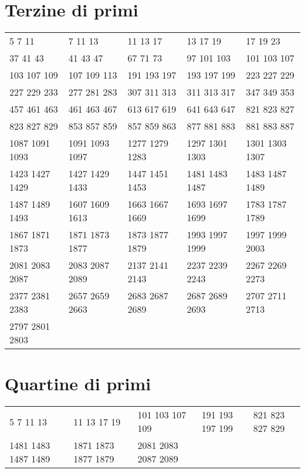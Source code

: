 \section{Terzine di primi}
\begin{center}
 \footnotesize
 \begin{tabular}{*{5}{l}}
  \toprule 
 5 7 11 & 7 11 13 & 11 13 17 & 13 17 19 & 17 19 23 \\
 37 41 43 & 41 43 47 & 67 71 73 & 97 101 103 & 101 103 107 \\
 103 107 109 & 107 109 113 & 191 193 197 & 193 197 199 & 223 227 229 \\
 227 229 233 & 277 281 283 & 307 311 313 & 311 313 317 & 347 349 353 \\
 457 461 463 & 461 463 467 & 613 617 619 & 641 643 647 & 821 823 827 \\
 823 827 829 & 853 857 859 & 857 859 863 & 877 881 883 & 881 883 887 \\
 1087 1091 1093 & 1091 1093 1097 & 1277 1279 1283 & 1297 1301 1303 & 1301 1303 1307 \\
 1423 1427 1429 & 1427 1429 1433 & 1447 1451 1453 & 1481 1483 1487 & 1483 1487 1489 \\
 1487 1489 1493 & 1607 1609 1613 & 1663 1667 1669 & 1693 1697 1699 & 1783 1787 1789 \\
 1867 1871 1873 & 1871 1873 1877 & 1873 1877 1879 & 1993 1997 1999 & 1997 1999 2003 \\
 2081 2083 2087 & 2083 2087 2089 & 2137 2141 2143 & 2237 2239 2243 & 2267 2269 2273 \\
 2377 2381 2383 & 2657 2659 2663 & 2683 2687 2689 & 2687 2689 2693 & 2707 2711 2713 \\
 2797 2801 2803 \\ 
  \bottomrule
 \end{tabular}
\end{center}
\section{Quartine di primi}
\begin{center}
 \footnotesize
 \begin{tabular}{*{5}{l}}
  \toprule 
 5 7 11 13 & 11 13 17 19 & 101 103 107 109 & 191 193 197 199 & 821 823 827 829 \\
 1481 1483 1487 1489 & 1871 1873 1877 1879 & 2081 2083 2087 2089 \\
  \bottomrule
 \end{tabular}
\end{center}